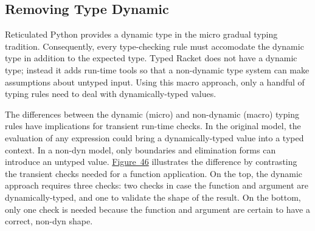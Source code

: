 \documentclass[ twoside,open=right,titlepage,numbers=noenddot,headinclude,%
                footinclude=true,cleardoublepage=empty,abstract=off,
                BCOR=5mm,paper=a4,fontsize=11pt,%
                ngerman,american,%
                parts,pdfspacing]{scrreprt}
\newcommand{\Ssubsubsection}[2]{\subsubsection[#1]{#2}}
\newcommand{\FigureRef}[2]{#1}
\renewcommand{\Ssubsubsection}[2]{\subsection[#1]{#2}}
\begin{document}
\Ssubsubsection{Removing Type Dynamic}{Removing Type Dynamic}\label{t:x28part_x22secx3atransientx3atheoryx3adynx22x29}

Reticulated Python provides a dynamic type in the micro gradual typing
 tradition.
Consequently, every type{-}checking rule must accomodate the dynamic type
 in addition to the expected type.
Typed Racket does not have a dynamic type; instead it adds run{-}time tools
 so that a non{-}dynamic type system can make assumptions about untyped input.
Using this macro approach, only a handful of typing rules need to deal
 with dynamically{-}typed values.

The differences between the dynamic (micro) and non{-}dynamic (macro) typing rules have implications
 for transient run{-}time checks.
In the original model, the evaluation of any expression could bring
 a dynamically{-}typed value into a typed context.
In a non{-}dyn model, only boundaries and elimination forms can introduce
 an untyped value.
\hyperref[t:x28counter_x28x22figurex22_x22figx3atransientx3aappx2dcomparex22x29x29]{Figure~\FigureRef{46}{t:x28counter_x28x22figurex22_x22figx3atransientx3aappx2dcomparex22x29x29}} illustrates the difference by contrasting
 the transient checks needed for a function application.
On the top, the dynamic approach requires three checks: two checks in case
 the function and argument are dynamically{-}typed, and one to validate the
 shape of the result.
On the bottom, only one check is needed because the function and argument
 are certain to have a correct, non{-}dyn shape.
\end{document}
